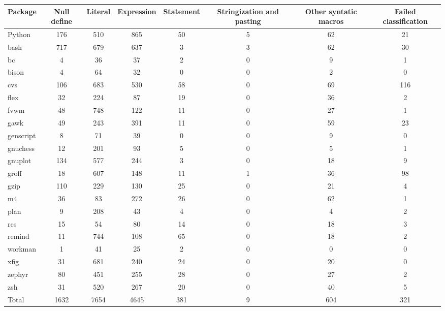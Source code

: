 \begin{tabular}{|l|c|c|c|c|c|c|c|}\hline
Package & Null define & Literal & Expression & Statement & Stringization and pasting & Other syntatic macros & Failed classification\\\hline
Python & 176 & 510 & 865 & 50 & 5 & 62 & 21\\\hline
bash & 717 & 679 & 637 & 3 & 3 & 62 & 30\\\hline
bc & 4 & 36 & 37 & 2 & 0 & 9 & 1\\\hline
bison & 4 & 64 & 32 & 0 & 0 & 2 & 0\\\hline
cvs & 106 & 683 & 530 & 58 & 0 & 69 & 116\\\hline
flex & 32 & 224 & 87 & 19 & 0 & 36 & 2\\\hline
fvwm & 48 & 748 & 122 & 11 & 0 & 27 & 1\\\hline
gawk & 49 & 243 & 391 & 11 & 0 & 59 & 23\\\hline
genscript & 8 & 71 & 39 & 0 & 0 & 9 & 0\\\hline
gnuchess & 12 & 201 & 93 & 5 & 0 & 5 & 1\\\hline
gnuplot & 134 & 577 & 244 & 3 & 0 & 18 & 9\\\hline
groff & 18 & 607 & 148 & 11 & 1 & 36 & 98\\\hline
gzip & 110 & 229 & 130 & 25 & 0 & 21 & 4\\\hline
m4 & 36 & 83 & 272 & 26 & 0 & 62 & 1\\\hline
plan & 9 & 208 & 43 & 4 & 0 & 4 & 2\\\hline
rcs & 15 & 54 & 80 & 14 & 0 & 18 & 3\\\hline
remind & 11 & 744 & 108 & 65 & 0 & 18 & 2\\\hline
workman & 1 & 41 & 25 & 2 & 0 & 0 & 0\\\hline
xfig & 31 & 681 & 240 & 24 & 0 & 20 & 0\\\hline
zephyr & 80 & 451 & 255 & 28 & 0 & 27 & 2\\\hline
zsh & 31 & 520 & 267 & 20 & 0 & 40 & 5\\\hline
\hline
Total & 1632 & 7654 & 4645 & 381 & 9 & 604 & 321\\\hline
\end{tabular}